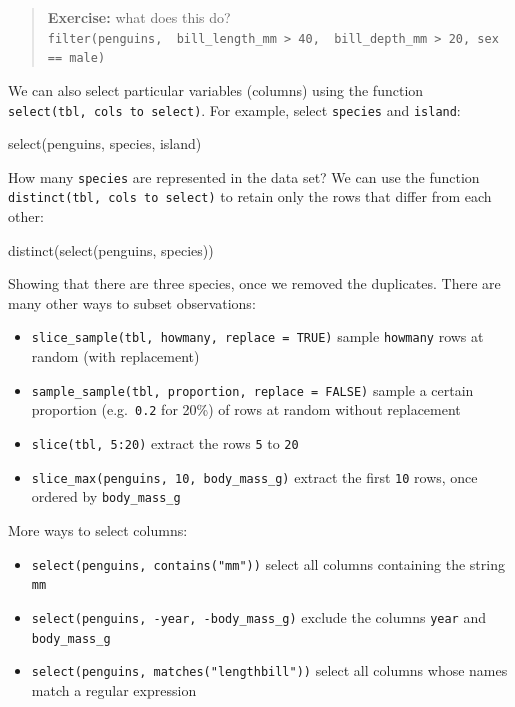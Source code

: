 \documentclass[
  letterpaper,
  DIV=11,
  numbers=noendperiod]{scrreprt}
\newenvironment{Shaded}{\begin{snugshade}}{\end{snugshade}}
\newcommand{\NormalTok}[1]{\textcolor[rgb]{0.00,0.23,0.31}{#1}}
\providecommand{\tightlist}{%
  \setlength{\itemsep}{0pt}\setlength{\parskip}{0pt}}\usepackage{longtable,booktabs,array}
\begin{document}
\begin{quote}
\textbf{Exercise:} what does this do?
\texttt{filter(penguins,\ \ bill\_length\_mm\ \textgreater{}\ 40,\ \ bill\_depth\_mm\ \textgreater{}\ 20,\ sex\ ==\ male)}
\end{quote}

We can also select particular variables (columns) using the function
\texttt{select(tbl,\ cols\ to\ select)}. For example, select
\texttt{species} and \texttt{island}:

\begin{Shaded}
\begin{Highlighting}[]
\NormalTok{select(penguins, species, island)}
\end{Highlighting}
\end{Shaded}

How many \texttt{species} are represented in the data set? We can use
the function \texttt{distinct(tbl,\ cols\ to\ select)} to retain only
the rows that differ from each other:

\begin{Shaded}
\begin{Highlighting}[]
\NormalTok{distinct(select(penguins, species))}
\end{Highlighting}
\end{Shaded}

Showing that there are three species, once we removed the duplicates.
There are many other ways to subset observations:

\begin{itemize}
\tightlist
\item
  \texttt{slice\_sample(tbl,\ howmany,\ replace\ =\ TRUE)} sample
  \texttt{howmany} rows at random (with replacement)
\item
  \texttt{sample\_sample(tbl,\ proportion,\ replace\ =\ FALSE)} sample a
  certain proportion (e.g.~\texttt{0.2} for 20\%) of rows at random
  without replacement
\item
  \texttt{slice(tbl,\ 5:20)} extract the rows \texttt{5} to \texttt{20}
\item
  \texttt{slice\_max(penguins,\ 10,\ body\_mass\_g)} extract the first
  \texttt{10} rows, once ordered by \texttt{body\_mass\_g}
\end{itemize}

More ways to select columns:

\begin{itemize}
\tightlist
\item
  \texttt{select(penguins,\ contains("mm"))} select all columns
  containing the string \texttt{mm}
\item
  \texttt{select(penguins,\ -year,\ -body\_mass\_g)} exclude the columns
  \texttt{year} and \texttt{body\_mass\_g}
\item
  \texttt{select(penguins,\ matches("length\textbar{}bill"))} select all
  columns whose names match a regular expression
\end{itemize}
\end{document}
